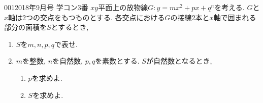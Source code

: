 \begin{prob}{001}{}{2018年9月号 学コン3番}
 $xy$平面上の放物線$G: y=mx^2 + px + q^n$を考える. $G$と$x$軸は2つの交点をもつものとする. 各交点における$G$の接線2本と$x$軸で囲まれる部分の面積を$S$とするとき,
 \begin{enumerate}
  \item $S$を$m,n,p,q$で表せ.
  \item $m$を整数, $n$を自然数, $p,q$を素数とする. $S$が自然数となるとき,
  \begin{enumerate}
   \item $p$を求めよ.
   \item $S$を求めよ.
  \end{enumerate}
 \end{enumerate}
\end{prob}
